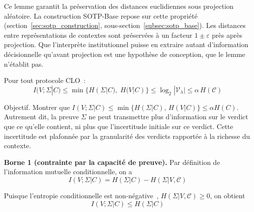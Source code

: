 \begin{sloppypar}
Ce lemme garantit la pr\'eservation des distances euclidiennes sous projection
al\'eatoire. La construction SOTP-Base repose sur cette propri\'et\'e
(section~\ref{sec:sotp_construction}, sous-section~\ref{subsec:sotp_base}).
Les distances entre repr\'esentations de contextes sont pr\'eserv\'ees \`a un
facteur $1 \pm \varepsilon$ pr\`es apr\`es projection. Que l'interpr\`ete
institutionnel puisse en extraire autant d'information d\'ecisionnelle
qu'avant projection est une hypoth\`ese de conception, que le lemme n'\'etablit pas.

\begin{theorem}\label{thm:goulot_contexte}
Pour tout protocole CLO~:
\begin{equation}
I(V;\Sigma|C) \leq \min\bigl\{H(\Sigma|C),\; H(V|C)\bigr\}
  \leq \log_2|\mathcal{V}_\lambda| \leq \alpha\, H(\mathcal{C})
\label{eq:goulot_contextuel}
\end{equation}
\end{theorem}

\begin{Preuve}\label{prv:goulot_contexte}

\begin{cmtEtape}{Objectif.}
Montrer que $I(V;\Sigma|C) \leq \min\{H(\Sigma|C),\, H(V|C)\} \leq \alpha H(C)$.
Autrement dit, la preuve $\Sigma$ ne peut transmettre plus d'information
sur le verdict que ce qu'elle contient, ni plus que l'incertitude
initiale sur ce verdict. Cette incertitude est plafonn\'ee par la granularit\'e des
verdicts rapport\'ee \`a la richesse du contexte.
\end{cmtEtape}

\textbf{Borne 1 (contrainte par la capacit\'e de preuve).}
Par d\'efinition de l'information mutuelle conditionnelle, on a
\begin{equation}
I(V;\Sigma|C) = H(\Sigma|C) - H(\Sigma|V,\mathcal{C})
\end{equation}

Puisque l'entropie conditionnelle est non-n\'egative~\cite{CoverThomas06},
$H(\Sigma|V,\mathcal{C}) \geq 0$, on obtient
\begin{equation}
I(V;\Sigma|C) \leq H(\Sigma|C)
\end{equation}


\end{Preuve}
\end{sloppypar}
